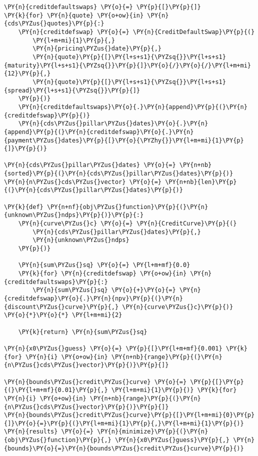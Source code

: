 \begin{Answer}
\begin{tcolorbox}[breakable, size=fbox, boxrule=1pt, pad at break*=1mm,colback=cellbackground, colframe=cellborder]
\begin{Verbatim}[commandchars=\\\{\}]
\PY{n}{creditdefaultswaps} \PY{o}{=} \PY{p}{[}\PY{p}{]}
\PY{k}{for} \PY{n}{quote} \PY{o+ow}{in} \PY{n}{cds\PYZus{}quotes}\PY{p}{:}
    \PY{n}{creditdefswap} \PY{o}{=} \PY{n}{CreditDefaultSwap}\PY{p}{(}
        \PY{l+m+mi}{1}\PY{p}{,}            
        \PY{n}{pricing\PYZus{}date}\PY{p}{,}
        \PY{n}{quote}\PY{p}{[}\PY{l+s+s1}{\PYZsq{}}\PY{l+s+s1}{maturity}\PY{l+s+s1}{\PYZsq{}}\PY{p}{]}\PY{o}{/}\PY{o}{/}\PY{l+m+mi}{12}\PY{p}{,}
        \PY{n}{quote}\PY{p}{[}\PY{l+s+s1}{\PYZsq{}}\PY{l+s+s1}{spread}\PY{l+s+s1}{\PYZsq{}}\PY{p}{]}   
    \PY{p}{)}
    \PY{n}{creditdefaultswaps}\PY{o}{.}\PY{n}{append}\PY{p}{(}\PY{n}{creditdefswap}\PY{p}{)}
    \PY{n}{cds\PYZus{}pillar\PYZus{}dates}\PY{o}{.}\PY{n}{append}\PY{p}{(}\PY{n}{creditdefswap}\PY{o}{.}\PY{n}{payment\PYZus{}dates}\PY{p}{[}\PY{o}{\PYZhy{}}\PY{l+m+mi}{1}\PY{p}{]}\PY{p}{)}
    
\PY{n}{cds\PYZus{}pillar\PYZus{}dates} \PY{o}{=} \PY{n+nb}{sorted}\PY{p}{(}\PY{n}{cds\PYZus{}pillar\PYZus{}dates}\PY{p}{)}
\PY{n}{n\PYZus{}cds\PYZus{}vector} \PY{o}{=} \PY{n+nb}{len}\PY{p}{(}\PY{n}{cds\PYZus{}pillar\PYZus{}dates}\PY{p}{)}

\PY{k}{def} \PY{n+nf}{obj\PYZus{}function}\PY{p}{(}\PY{n}{unknown\PYZus{}ndps}\PY{p}{)}\PY{p}{:}
    \PY{n}{curve\PYZus{}c} \PY{o}{=} \PY{n}{CreditCurve}\PY{p}{(}
        \PY{n}{cds\PYZus{}pillar\PYZus{}dates}\PY{p}{,}
        \PY{n}{unknown\PYZus{}ndps}
    \PY{p}{)}

    \PY{n}{sum\PYZus{}sq} \PY{o}{=} \PY{l+m+mf}{0.0}
    \PY{k}{for} \PY{n}{creditdefswap} \PY{o+ow}{in} \PY{n}{creditdefaultswaps}\PY{p}{:}
        \PY{n}{sum\PYZus{}sq} \PY{o}{+}\PY{o}{=} \PY{n}{creditdefswap}\PY{o}{.}\PY{n}{npv}\PY{p}{(}\PY{n}{discount\PYZus{}curve}\PY{p}{,} \PY{n}{curve\PYZus{}c}\PY{p}{)} \PY{o}{*}\PY{o}{*} \PY{l+m+mi}{2}

    \PY{k}{return} \PY{n}{sum\PYZus{}sq}

\PY{n}{x0\PYZus{}guess} \PY{o}{=} \PY{p}{[}\PY{l+m+mf}{0.001} \PY{k}{for} \PY{n}{i} \PY{o+ow}{in} \PY{n+nb}{range}\PY{p}{(}\PY{n}{n\PYZus{}cds\PYZus{}vector}\PY{p}{)}\PY{p}{]}

\PY{n}{bounds\PYZus{}credit\PYZus{}curve} \PY{o}{=} \PY{p}{[}\PY{p}{(}\PY{l+m+mf}{0.01}\PY{p}{,} \PY{l+m+mi}{1}\PY{p}{)} \PY{k}{for} \PY{n}{i} \PY{o+ow}{in} \PY{n+nb}{range}\PY{p}{(}\PY{n}{n\PYZus{}cds\PYZus{}vector}\PY{p}{)}\PY{p}{]}
\PY{n}{bounds\PYZus{}credit\PYZus{}curve}\PY{p}{[}\PY{l+m+mi}{0}\PY{p}{]}\PY{o}{=}\PY{p}{(}\PY{l+m+mi}{1}\PY{p}{,}\PY{l+m+mi}{1}\PY{p}{)}
\PY{n}{results} \PY{o}{=} \PY{n}{minimize}\PY{p}{(}\PY{n}{obj\PYZus{}function}\PY{p}{,} \PY{n}{x0\PYZus{}guess}\PY{p}{,} \PY{n}{bounds}\PY{o}{=}\PY{n}{bounds\PYZus{}credit\PYZus{}curve}\PY{p}{)}


\end{Verbatim}
\end{tcolorbox}
\end{Answer}
